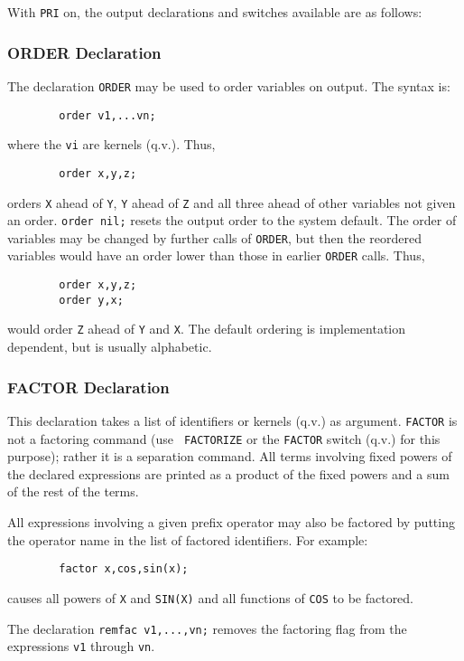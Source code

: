 With {\tt PRI} on, the output declarations
and switches available are as follows:

\subsubsection{ORDER Declaration}

The declaration {\tt ORDER}  may be used to order variables
on output.  The syntax is:
\begin{verbatim}
        order v1,...vn;
\end{verbatim}
where the {\tt vi} are kernels (q.v.). Thus,
\begin{verbatim}
        order x,y,z;
\end{verbatim}
orders {\tt X} ahead of {\tt Y}, {\tt Y} ahead of {\tt Z} and all three
ahead of other variables not given an order. {\tt order nil;} resets the
output order to the system default.  The order of variables may be changed
by further calls of {\tt ORDER}, but then the reordered variables would
have an order lower than those in earlier {\tt ORDER}  calls.
Thus,
\begin{verbatim}
        order x,y,z;
        order y,x;
\end{verbatim}
would order {\tt Z} ahead of {\tt Y} and {\tt X}.  The default ordering is
implementation dependent, but is usually alphabetic.

\subsubsection{FACTOR Declaration}

This declaration takes a list of identifiers or kernels
(q.v.) as argument. {\tt FACTOR} is not a factoring command (use {\tt
FACTORIZE} or the {\tt FACTOR} switch (q.v.) for this purpose); rather it
is a separation command.  All terms involving fixed powers of the declared
expressions are printed as a product of the fixed powers and a sum of the
rest of the terms.

All expressions involving a given prefix operator may also be factored by
putting the operator name in the list of factored identifiers. For example:
\begin{verbatim}
        factor x,cos,sin(x);
\end{verbatim}
causes all powers of {\tt X} and {\tt SIN(X)} and all functions of
{\tt COS} to be factored.

The declaration {\tt remfac v1,...,vn;}  removes the
factoring flag from the expressions {\tt v1} through {\tt vn}.

